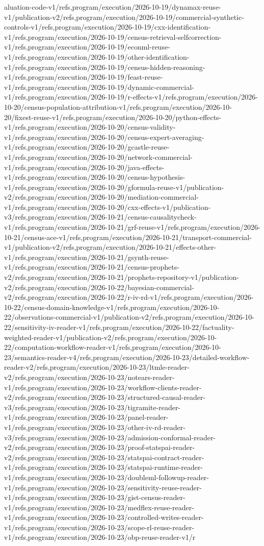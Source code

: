 \documentclass[11pt,a4paper,openany]{book}
\begin{document}
aluation-code-v1/refs,program/execution/2026-10-19/dynamax-reuse-v1/publication-v2/refs,program/execution/2026-10-19/commercial-synthetic-controls-v1/refs,program/execution/2026-10-19/cxx-identification-v1/refs,program/execution/2026-10-19/census-retrieval-selfcorrection-v1/refs,program/execution/2026-10-19/econml-reuse-v1/refs,program/execution/2026-10-19/other-identification-v1/refs,program/execution/2026-10-19/census-hidden-reasoning-v1/refs,program/execution/2026-10-19/feast-reuse-v1/refs,program/execution/2026-10-19/dynamic-commercial-v1/refs,program/execution/2026-10-19/r-effects-v1/refs,program/execution/2026-10-20/census-population-attribution-v1/refs,program/execution/2026-10-20/fixest-reuse-v1/refs,program/execution/2026-10-20/python-effects-v1/refs,program/execution/2026-10-20/census-validity-v1/refs,program/execution/2026-10-20/census-expert-averaging-v1/refs,program/execution/2026-10-20/gcastle-reuse-v1/refs,program/execution/2026-10-20/network-commercial-v1/refs,program/execution/2026-10-20/java-effects-v1/refs,program/execution/2026-10-20/census-hypothesis-v1/refs,program/execution/2026-10-20/gformula-reuse-v1/publication-v2/refs,program/execution/2026-10-20/mediation-commercial-v1/refs,program/execution/2026-10-20/cxx-effects-v1/publication-v3/refs,program/execution/2026-10-21/census-causalitycheck-v1/refs,program/execution/2026-10-21/grf-reuse-v1/refs,program/execution/2026-10-21/census-ace-v1/refs,program/execution/2026-10-21/transport-commercial-v1/publication-v2/refs,program/execution/2026-10-21/effects-other-v1/refs,program/execution/2026-10-21/gsynth-reuse-v1/refs,program/execution/2026-10-21/census-prophets-v2/refs,program/execution/2026-10-21/prophets-repository-v1/publication-v2/refs,program/execution/2026-10-22/bayesian-commercial-v2/refs,program/execution/2026-10-22/r-iv-rd-v1/refs,program/execution/2026-10-22/census-domain-knowledge-v1/refs,program/execution/2026-10-22/observations-commercial-v1/publication-v2/refs,program/execution/2026-10-22/sensitivity-iv-reader-v1/refs,program/execution/2026-10-22/factuality-weighted-reader-v1/publication-v2/refs,program/execution/2026-10-22/computation-workflow-reader-v1/refs,program/execution/2026-10-23/semantics-reader-v4/refs,program/execution/2026-10-23/detailed-workflow-reader-v2/refs,program/execution/2026-10-23/ltmle-reader-v2/refs,program/execution/2026-10-23/notears-reader-v1/refs,program/execution/2026-10-23/workflow-clients-reader-v2/refs,program/execution/2026-10-23/structured-causal-reader-v3/refs,program/execution/2026-10-23/tigramite-reader-v1/refs,program/execution/2026-10-23/panel-reader-v1/refs,program/execution/2026-10-23/other-iv-rd-reader-v3/refs,program/execution/2026-10-23/admission-conformal-reader-v2/refs,program/execution/2026-10-23/proof-statspai-reader-v2/refs,program/execution/2026-10-23/statspai-contract-reader-v1/refs,program/execution/2026-10-23/statspai-runtime-reader-v1/refs,program/execution/2026-10-23/doubleml-followup-reader-v1/refs,program/execution/2026-10-23/sensitivity-reuse-reader-v1/refs,program/execution/2026-10-23/gist-census-reader-v1/refs,program/execution/2026-10-23/medflex-reuse-reader-v1/refs,program/execution/2026-10-23/controlled-writes-reader-v1/refs,program/execution/2026-10-23/scope-rl-reuse-reader-v1/refs,program/execution/2026-10-23/obp-reuse-reader-v1/r
\end{document}
